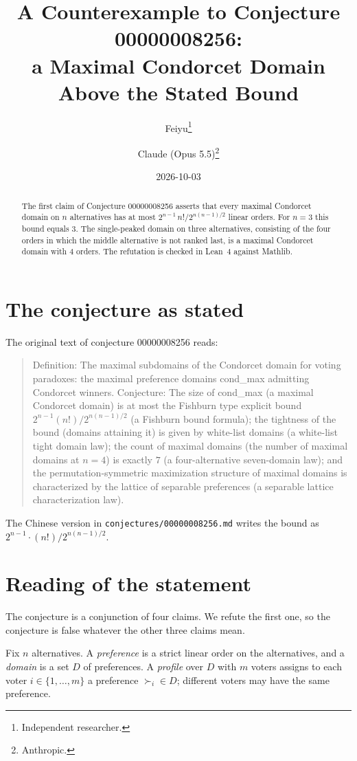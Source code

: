 \documentclass[11pt]{article}
\title{A Counterexample to Conjecture 00000008256:\\
a Maximal Condorcet Domain Above the Stated Bound}
\author{%
  Feiyu\thanks{Independent researcher.}
  \and
  Claude (Opus 5.5)\thanks{Anthropic.}%
}
\date{2026-10-03}
\theoremstyle{plain}
\theoremstyle{definition}
\theoremstyle{remark}
\begin{document}
\maketitle

\begin{abstract}
The first claim of Conjecture 00000008256 asserts that every maximal Condorcet
domain on $n$ alternatives has at most $2^{n-1}\,n!/2^{n(n-1)/2}$ linear orders.
For $n=3$ this bound equals $3$. The single-peaked domain on three alternatives,
consisting of the four orders in which the middle alternative is not ranked last, is
a maximal Condorcet domain with $4$ orders. The refutation is checked in Lean~4
against Mathlib.
\end{abstract}

\section{The conjecture as stated}

The original text of conjecture 00000008256 reads:

\begin{quote}
Definition: The maximal subdomains of the Condorcet domain for voting paradoxes: the
maximal preference domains cond\_max admitting Condorcet winners. Conjecture: The
size of cond\_max (a maximal Condorcet domain) is at most the Fishburn type explicit
bound $2^{n-1} (n!)/2^{n(n-1)/2}$ (a Fishburn bound formula); the tightness of the
bound (domains attaining it) is given by white-list domains (a white-list tight
domain law); the count of maximal domains (the number of maximal domains at $n = 4$)
is exactly $7$ (a four-alternative seven-domain law); and the permutation-symmetric
maximization structure of maximal domains is characterized by the lattice of
separable preferences (a separable lattice characterization law).
\end{quote}

The Chinese version in \texttt{conjectures/00000008256.md} writes the bound as
$2^{n-1}\cdot(n!)/2^{n(n-1)/2}$.

\section{Reading of the statement}

The conjecture is a conjunction of four claims. We refute the first one, so the
conjecture is false whatever the other three claims mean.

Fix $n$ alternatives. A \emph{preference} is a strict linear order on the
alternatives, and a \emph{domain} is a set $D$ of preferences. A \emph{profile} over
$D$ with $m$ voters assigns to each voter $i\in\{1,\dots,m\}$ a preference
$\succ_i\in D$; different voters may have the same preference.
\end{document}
